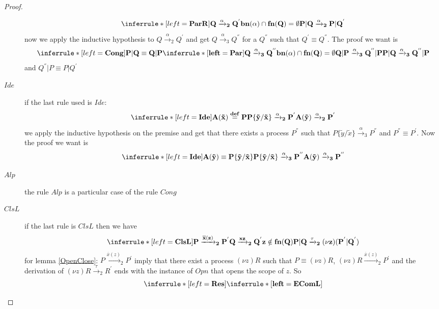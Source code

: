 \begin{lemma}
\begin{proof}
\begin{description}
		\[
		  \inferrule* [left=\bf{ParR}]{
		      Q\xrightarrow{\alpha}_{2}Q^{'}
		    \\
		      bn(\alpha)\cap fn(Q)=\emptyset
		  }{
		      P|Q\xrightarrow{\alpha}_{2}P|Q^{'}
		  }
		\]	
		now we apply the inductive hypothesis to $Q\xrightarrow{\alpha}_{2}Q^{'}$ and get $Q\xrightarrow{\alpha}_{3}Q^{''}$ for a $Q^{''}$ such that $Q^{'}\equiv Q^{''}$. The proof we want is
		\[
		  \inferrule* [left=\bf{Cong}]{
		      P|Q\equiv Q|P
		    \\
		      \inferrule* [left=\bf{Par}]{
			  Q\xrightarrow{\alpha}_{3}Q^{''}
			\\
			  bn(\alpha)\cap fn(Q)=\emptyset
		      }{
			  Q|P\xrightarrow{\alpha}_{3}Q^{''}|P
		      }
		    }{
		      P|Q\xrightarrow{\alpha}_{3}Q^{''}|P
		    }
		\]
		and $Q^{''}|P\equiv P|Q^{'}$
      \item[$Ide$]
		if the last rule used is $Ide$:
		\[
		    \inferrule* [left=\bf{Ide}]{
			A(\tilde{x}) \stackrel{def}{=} P
		      \\
			P\{\tilde{y}/\tilde{x}\} \xrightarrow{\alpha}_{2} P^{'}
		    }{
		      A(\tilde{y}) \xrightarrow{\alpha}_{2} P^{'}
		    }
		\]
		we apply the inductive hypothesis on the premise and get that there exists a process $P^{''}$ such that $P\{\tilde{y}/\tilde{x}\}\xrightarrow{\alpha}_{3}P^{''}$ and $P^{''}\equiv P^{'}$. Now the proof we want is
		\[
		    \inferrule* [left=\bf{Ide}]{
			A(\tilde{y}) \equiv P\{\tilde{y}/\tilde{x}\}
		      \\
			P\{\tilde{y}/\tilde{x}\}\xrightarrow{\alpha}_{3}P^{''}
		    }{
		      A(\tilde{y})\xrightarrow{\alpha}_{3}P^{''}
		    }
		\]		
      \item[$Alp$]
	the rule $Alp$ is a particular case of the rule $Cong$
      \item[$ClsL$]
	if the last rule is $ClsL$ then we have
		\[
		    \inferrule* [left=\bf{ClsL}]{
			P\xrightarrow{\overline{x}(z)}_{2}P^{'}
		      \\
			Q\xrightarrow{xz}_{2}Q^{'}
		      \\
			z\notin fn(Q)
		    }{
		      P|Q\xrightarrow{\tau}_{2}(\nu z)(P^{'}|Q^{'})
		    }
		\]
	for lemma \ref{OpenClose}: $P\xrightarrow{\overline{x}(z)}_{2}P^{'}$ imply that there exist a process $(\nu z)R$ such that $P \equiv (\nu z)R$, $(\nu z)R \xrightarrow{\overline{x}(z)}_{2} P^{'}$ and the derivation of $(\nu z)R \xrightarrow{\tau}_{2} R^{'}$ ends with the instance of $Opn$ that opens the scope of $z$. So 
		\[
		  \inferrule* [left=\bf{Res}]{
		    \inferrule* [left=\bf{EComL}]{
}}\]
\end{description}
\end{proof}
\end{lemma}

